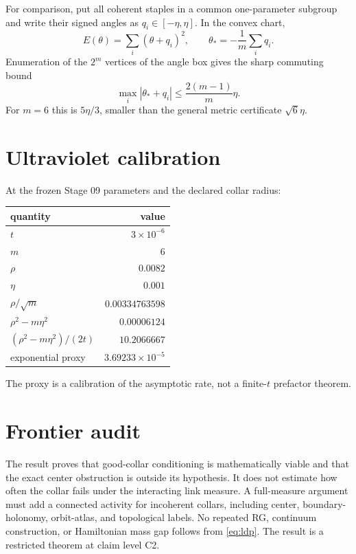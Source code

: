 \documentclass[11pt]{article}
\begin{document}
For comparison, put all coherent staples in a common one-parameter subgroup
and write their signed angles as $q_i\in[-\eta,\eta]$.  In the convex chart,
\[
 E(\theta)=\sum_i(\theta+q_i)^2,
 \qquad \theta_*=-\frac1m\sum_iq_i.
\]
Enumeration of the $2^m$ vertices of the angle box gives the sharp commuting
bound
\begin{equation}
 \max_i|\theta_*+q_i|\leq\frac{2(m-1)}m\eta.
\end{equation}
For $m=6$ this is $5\eta/3$, smaller than the general metric certificate
$\sqrt6\eta$.

\section{Ultraviolet calibration}

At the frozen Stage 09 parameters and the declared collar radius:
\begin{center}
\begin{tabular}{@{}lr@{}}
\toprule
quantity & value\\
\midrule
$t$ & $3\times10^{-6}$\\
$m$ & $6$\\
$\rho$ & $0.0082$\\
$\eta$ & $0.001$\\
$\rho/\sqrt m$ & $0.00334763598$\\
$\rho^2-m\eta^2$ & $0.00006124$\\
$(\rho^2-m\eta^2)/(2t)$ & $10.2066667$\\
exponential proxy & $3.69233\times10^{-5}$\\
\bottomrule
\end{tabular}
\end{center}
The proxy is a calibration of the asymptotic rate, not a finite-$t$ prefactor
theorem.

\section{Frontier audit}

The result proves that good-collar conditioning is mathematically viable and
that the exact center obstruction is outside its hypothesis.  It does not
estimate how often the collar fails under the interacting link measure.  A
full-measure argument must add a connected activity for incoherent collars,
including center, boundary-holonomy, orbit-atlas, and topological labels.  No
repeated RG, continuum construction, or Hamiltonian mass gap follows from
\eqref{eq:ldp}.  The result is a restricted theorem at claim level C2.
\end{document}
